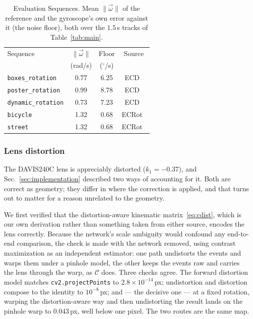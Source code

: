 \documentclass[journal]{IEEEtran}
\newcommand{\Cmat}{\mathcal{C}}
\newcommand{\wvec}{\vec{\omega}}
\begin{document}
\begin{table}[!t]
\renewcommand{\arraystretch}{1.2}
\caption{Evaluation Sequences. \textnormal{Mean $\|\wvec\|$ of the reference
and the gyroscope's own error against it (the noise floor), both over the
$1.5$\,s tracks of Table~\ref{tab:main}.}}
\label{tab:datasets}
\centering
\footnotesize
\begin{tabular}{@{}lccc@{}}
\toprule
Sequence & $\|\wvec\|$ & Floor & Source \\
 & (rad/s) & ($^\circ$/s) & \\
\midrule
\texttt{boxes\_rotation}   & 0.77 & 6.25 & ECD~\cite{mueggler2017} \\
\texttt{poster\_rotation}  & 0.99 & 8.78 & ECD~\cite{mueggler2017} \\
\texttt{dynamic\_rotation} & 0.73 & 7.23 & ECD~\cite{mueggler2017} \\
\texttt{bicycle}           & 1.32 & 0.68 & ECRot~\cite{guo2024cmaxslam} \\
\texttt{street}            & 1.32 & 0.68 & ECRot~\cite{guo2024cmaxslam} \\
\bottomrule
\end{tabular}
\end{table}
\subsubsection{Lens distortion}
\label{sec:distortion}

The DAVIS240C lens is appreciably distorted ($k_1 = -0.37$), and
Sec.~\ref{sec:implementation} described two ways of accounting for it. Both are
correct as geometry; they differ in where the correction is applied, and that
turns out to matter for a reason unrelated to the geometry.

We first verified that the distortion-aware kinematic
matrix~\eqref{eq:cdist}, which is our own derivation rather than something taken
from either source, encodes the lens correctly. Because the network's scale
ambiguity would confound any end-to-end comparison, the check is made with the
network removed, using contrast maximization as an independent estimator: one
path undistorts the events and warps them under a pinhole model, the other keeps
the events raw and carries the lens through the warp, as $\Cmat$ does. Three
checks agree. The forward distortion model matches \texttt{cv2.projectPoints} to
$2.8\times10^{-14}$\,px; undistortion and distortion compose to the identity to
$10^{-8}$\,px; and --- the decisive one --- at a fixed rotation, warping the
distortion-aware way and then undistorting the result lands on the pinhole warp
to $0.043$\,px, well below one pixel. The two routes are the same map.
\end{document}
